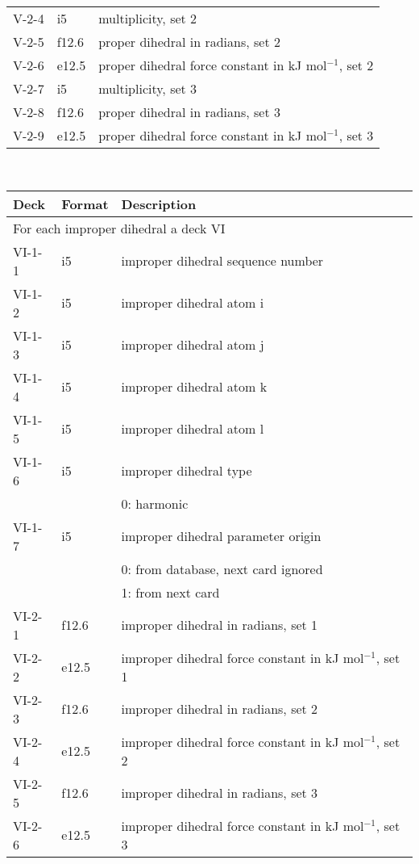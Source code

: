 \begin{center}
\begin{tabular*}{150mm}{p{12mm}p{12mm}l}
V-2-4 & i5     & multiplicity, set 2\\
V-2-5 & f12.6  & proper dihedral in radians, set 2\\
V-2-6 & e12.5  & proper dihedral force constant in kJ mol$^{-1}$, set 2 \\
V-2-7 & i5     & multiplicity, set 3\\
V-2-8 & f12.6  & proper dihedral in radians, set 3\\
V-2-9 & e12.5  & proper dihedral force constant in kJ mol$^{-1}$, set 3 \\
\hline
\end{tabular*}\\
\begin{tabular*}{150mm}{p{12mm}p{12mm}l}
\hline\hline
Deck & Format & Description \\ \hline
\multicolumn{3}{l}{For each improper dihedral a deck VI} \\
VI-1-1 & i5     & improper dihedral sequence number \\
VI-1-2 & i5     & improper dihedral atom i \\
VI-1-3 & i5     & improper dihedral atom j \\
VI-1-4 & i5     & improper dihedral atom k \\
VI-1-5 & i5     & improper dihedral atom l \\
VI-1-6 & i5     & improper dihedral type \\
       &        & 0: harmonic\\
VI-1-7 & i5     & improper dihedral parameter origin\\
       &        & 0: from database, next card ignored \\
       &        & 1: from next card\\
VI-2-1 & f12.6  & improper dihedral in radians, set 1\\
VI-2-2 & e12.5  & improper dihedral force constant in kJ mol$^{-1}$, set 1 \\
VI-2-3 & f12.6  & improper dihedral in radians, set 2\\
VI-2-4 & e12.5  & improper dihedral force constant in kJ mol$^{-1}$, set 2 \\
VI-2-5 & f12.6  & improper dihedral in radians, set 3\\
VI-2-6 & e12.5  & improper dihedral force constant in kJ mol$^{-1}$, set 3 \\
\hline\hline
\end{tabular*}
\end{center}

